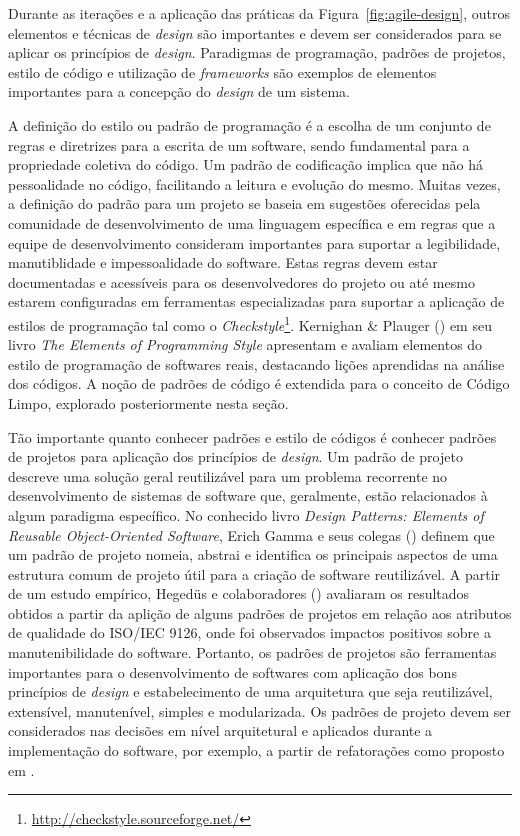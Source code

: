 %

Durante as iterações e a aplicação das práticas da Figura~\ref{fig:agile-design}, outros elementos e técnicas de \emph{design} são importantes e devem ser considerados para se aplicar os princípios de \emph{design}. Paradigmas de programação, padrões de projetos, estilo de código e utilização de \emph{frameworks} são exemplos de elementos importantes para a concepção do \emph{design} de um sistema.

%

A definição do estilo ou padrão de programação é a escolha de um conjunto de regras e diretrizes para a escrita de um software, sendo fundamental para a propriedade coletiva do código. Um padrão de codificação implica que não há pessoalidade no código, facilitando a leitura e evolução do mesmo. Muitas vezes, a definição do padrão para um projeto se baseia em sugestões oferecidas pela comunidade de desenvolvimento de uma linguagem específica e em regras que a equipe de desenvolvimento consideram importantes para suportar a legibilidade, manutiblidade e impessoalidade do software. Estas regras devem estar documentadas e acessíveis para os desenvolvedores do projeto ou até mesmo estarem configuradas em ferramentas especializadas para suportar a aplicação de estilos de programação tal como o \emph{Checkstyle}\footnote{\url{http://checkstyle.sourceforge.net/}}. Kernighan \& Plauger (\citeyear{kernighan1978}) em seu livro \emph{The Elements of Programming Style} apresentam e avaliam elementos do estilo de programação de softwares reais, destacando lições aprendidas na análise dos códigos. A noção de padrões de código é extendida para o conceito de Código Limpo, explorado posteriormente nesta seção.

%

Tão importante quanto conhecer padrões e estilo de códigos é conhecer padrões de projetos para aplicação dos princípios de \emph{design}. Um padrão de projeto descreve uma solução geral reutilizável para um problema recorrente no desenvolvimento de sistemas de software que, geralmente, estão relacionados à algum paradigma específico. No conhecido livro \emph{Design Patterns: Elements of Reusable Object-Oriented Software}, Erich Gamma e seus colegas (\citeyear{gof1994}) definem que um padrão de projeto nomeia, abstrai e identifica os principais aspectos de uma estrutura comum de projeto útil para a criação de software reutilizável. A partir de um estudo empírico, Hegedüs e colaboradores (\citeyear{hegedus}) avaliaram os resultados obtidos a partir da aplição de alguns padrões de projetos em relação aos atributos de qualidade do ISO/IEC 9126, onde foi observados impactos positivos sobre a manutenibilidade do software. Portanto, os padrões de projetos são ferramentas importantes para o desenvolvimento de softwares com aplicação dos bons princípios de \emph{design} e estabelecimento de uma arquitetura que seja reutilizável, extensível, manutenível, simples e modularizada. Os padrões de projeto devem ser considerados nas decisões em nível arquitetural e aplicados durante a implementação do software, por exemplo, a partir de refatorações como proposto em \cite{kerievsky2008}.

